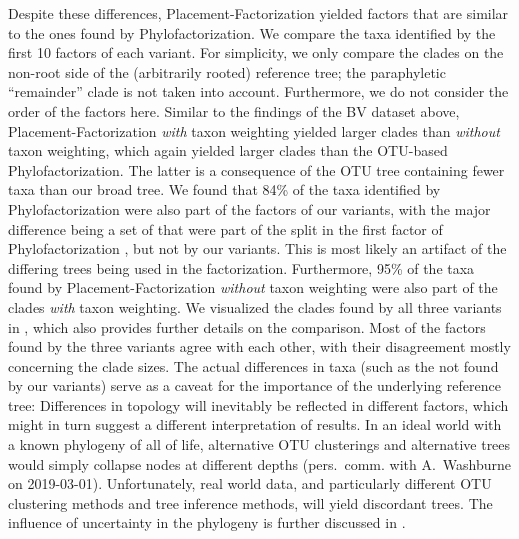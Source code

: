 Despite these differences, Placement-Factorization yielded factors that are similar to the ones found by Phylofactorization.
We compare the taxa identified by the first \num{10} factors of each variant.
For simplicity, we only compare the clades on the non-root side of the (arbitrarily rooted) reference tree;
the paraphyletic ``remainder'' clade is not taken into account.
Furthermore, we do not consider the order of the factors here.
Similar to the findings of the \ac{BV} dataset above,
Placement-Factorization \emph{with} taxon weighting yielded larger clades than \emph{without} taxon weighting,
which again yielded larger clades than the OTU-based Phylofactorization.
The latter is a consequence of the OTU tree containing fewer taxa than our broad  tree.
We found that 84\% of the taxa identified by Phylofactorization were also part of the factors of our variants,
with the major difference being a set of 
that were part of the split in the first factor of Phylofactorization \cite{Washburne2017a}, but not by our variants.
This is most likely an artifact of the differing trees being used in the factorization.
Furthermore, 95\% of the taxa found by Placement-Factorization \emph{without} taxon weighting
were also part of the clades \emph{with} taxon weighting.
We visualized the clades found by all three variants in ,
which also provides further details on the comparison.
Most of the factors found by the three variants agree with each other,
with their disagreement mostly concerning the clade sizes.
The actual differences in taxa (such as the  not found by our variants)
serve as a caveat for the importance of the underlying reference tree:
Differences in topology will inevitably be reflected in different factors,
which might in turn suggest a different interpretation of results.
In an ideal world with a known phylogeny of all of life, alternative OTU clusterings and alternative trees
would simply collapse nodes at different depths (pers.~comm. with A.~Washburne on 2019-03-01).
Unfortunately, real world data, and particularly different OTU clustering methods and tree inference methods,
will yield discordant trees.
The influence of uncertainty in the phylogeny is further discussed in \cite{Washburne2019}.


